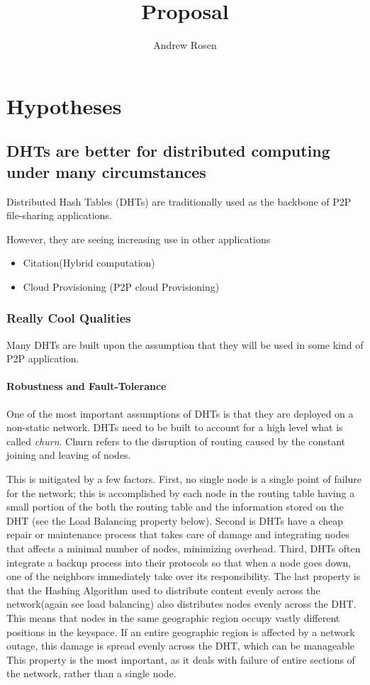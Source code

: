 \documentclass[10pt,letterpaper]{report}
\title{Proposal}
\author{Andrew Rosen}
\begin{document}
\maketitle
\setcounter{tocdepth}{4}
\tableofcontents
\newpage
\chapter{Hypotheses}

\section{DHTs are better for distributed computing under many circumstances}
Distributed Hash Tables (DHTs) are traditionally used as the backbone of P2P file-sharing applications.

However, they are seeing increasing use in other applications
\begin{itemize}
	\item Citation(Hybrid computation)
	\item Cloud Provisioning  (P2P cloud Provisioning)
\end{itemize}


\subsection{Really Cool Qualities}
Many DHTs are built upon the assumption that they will be used in some kind of P2P application.  
\subsubsection{Robustness and Fault-Tolerance}
One of the most important assumptions of DHTs is that they are deployed on a non-static network.
DHTs need to be built to account for a high level what is called \textit{churn}.  
Churn refers to the disruption of routing caused by the constant joining and leaving of nodes.

This is mitigated by a few factors.  
First, no single node is a single point of failure for the network;  this is accomplished by each node in the routing table having a small portion of the both the routing table and the information stored on the DHT (see the Load Balancing property below).  
Second is DHTs have a cheap repair or maintenance process that takes care of damage and integrating nodes that affects a minimal number of nodes, minimizing overhead. 
Third, DHTs often integrate a backup process into their protocols so that when a node goes down, one of the neighbors immediately take over its responsibility.
The last property is that the Hashing Algorithm used to distribute content evenly across the network(again see load balancing) also distributes nodes evenly across the DHT.  
This means that nodes in the same geographic region occupy vastly different positions in the keyspace.  
If an entire geographic region is affected by a network outage, this damage is spread evenly across the DHT, which can be manageable
This property is the most important, as it deals with failure of entire sections of the network, rather than a single node.
\end{document}
